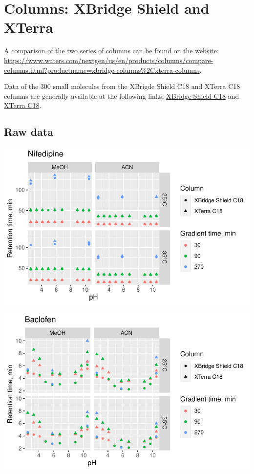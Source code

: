 \documentclass[
  letterpaper,
  DIV=11,
  numbers=noendperiod]{scrreprt}
\author{}
\date{}
\begin{document}
\ifdefined\Shaded\renewenvironment{Shaded}{\begin{tcolorbox}[frame hidden, sharp corners, borderline west={3pt}{0pt}{shadecolor}, enhanced, interior hidden, boxrule=0pt, breakable]}{\end{tcolorbox}}\fi

\hypertarget{columns-xbridge-shield-and-xterra}{%
\chapter*{Columns: XBridge Shield and
XTerra}\label{columns-xbridge-shield-and-xterra}}

A comparison of the two series of columns can be found on the website:
\url{https://www.waters.com/nextgen/us/en/products/columns/compare-columns.html?productname=xbridge-columns\%2Cxterra-columns}.

Data of the 300 small molecules from the XBrigde Shield C18 and XTerra
C18 columns are generally available at the following links:
\href{https://osf.io/zqtj7/?view_only=074c5324c26e44529273523b280ecb05}{XBridge
Shield C18} and
\href{https://osf.io/qbv7j/?view_only=c5431b9e9f68423ab665f5f5b2b4606f}{XTerra
C18}.

\hypertarget{raw-data}{%
\section{Raw data}\label{raw-data}}

\includegraphics{index_files/figure-pdf/unnamed-chunk-3-1.pdf}

\includegraphics{index_files/figure-pdf/unnamed-chunk-3-2.pdf}
\end{document}
